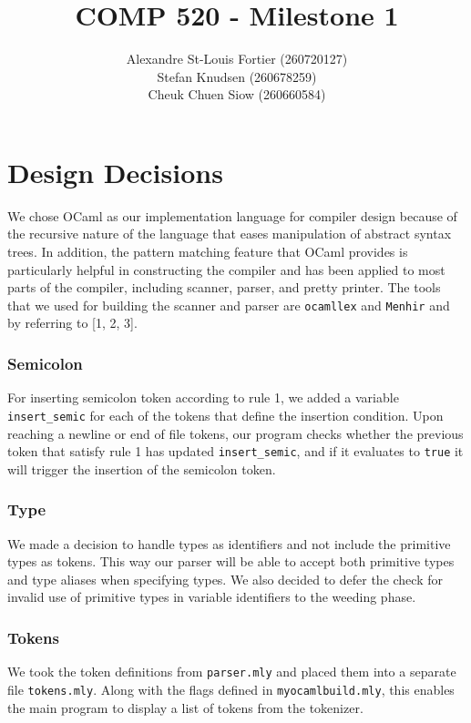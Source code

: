 \documentclass{article}
\begin{document}
\pagestyle{empty}

\title{COMP 520 - Milestone 1}
\author{
Alexandre St-Louis Fortier (260720127)\\
Stefan Knudsen (260678259)\\
Cheuk Chuen Siow (260660584)}
\maketitle

\raggedright
\section*{Design Decisions}
We chose OCaml as our implementation language for compiler design because of the recursive nature of the language that eases manipulation of abstract syntax trees. In addition, the pattern matching feature that OCaml provides is particularly helpful in constructing the compiler and has been applied to most parts of the compiler, including scanner, parser, and pretty printer. The tools that we used for building the scanner and parser are \verb|ocamllex| and \verb|Menhir| and by referring to [1, 2, 3].

\subsubsection*{Semicolon}
For inserting semicolon token according to rule 1, we added a variable \verb|insert_semic| for each of the tokens that define the insertion condition. Upon reaching a newline or end of file tokens, our program checks whether the previous token that satisfy rule 1 has updated \verb|insert_semic|, and if it evaluates to \verb|true| it will trigger the insertion of the semicolon token.

\subsubsection*{Type}
We made a decision to handle types as identifiers and not include the primitive types as tokens. This way our parser will be able to accept both primitive types and type aliases when specifying types. We also decided to defer the check for invalid use of primitive types in variable identifiers to the weeding phase.

\subsubsection*{Tokens}
We took the token definitions from \verb|parser.mly| and placed them into a separate file \verb|tokens.mly|. Along with the flags defined in \verb|myocamlbuild.mly|, this enables the main program to display a list of tokens from the tokenizer.
\end{document}

